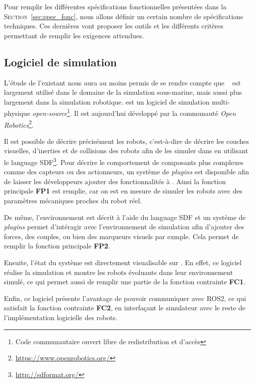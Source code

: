         Pour remplir les différentes spécifications fonctionnelles présentées dans la \textsc{Section}~\ref{sec:spec_fonc}, nous allons définir un certain nombre de spécifications techniques. Ces dernières vont proposer les outils et les différents critères permettant de remplir les exigences attendues.

        \subsection{Logiciel de simulation}

            L'étude de l'existant nous aura au moins permis de se rendre compte que \gazebo{}~\cite{Koenig-gazebo} est largement utilisé dans le domaine de la simulation sous-marine, mais aussi plus largement dans la simulation robotique. \gazebo{} est un logiciel de simulation multi-physique \textit{open-source}\footnote{Code communautaire ouvert libre de redistribution et d'accès}. Il est aujourd'hui développé par la communauté \textit{Open Robotics}\footnote{\url{https://www.openrobotics.org/}}.
            
            Il est possible de décrire précisément les robots, c'est-à-dire de décrire les couches visuelles, d'inerties et de collisions des robots afin de les simuler dans \gazebo{} en utilisant le language \gls{SDF}\footnote{\url{http://sdformat.org/}}. Pour décrire le comportement de composants plus complexes comme des capteurs ou des actionneurs, un système de \textit{plugins} est disponible afin de laisser les développeurs ajouter des fonctionnalités à \gazebo{}. Ainsi la fonction principale \textbf{FP1} est remplie, car on est en mesure de simuler les robots avec des paramètres mécaniques proches du robot réel.

            De même, l'environnement est décrit à l'aide du language \gls{SDF} et un système de \textit{plugins} permet d'intéragir avec l'environnement de simulation afin d'ajouter des forces, des couples, ou bien des marqueurs visuels par exmple. Cela permet de remplir la fonction principale \textbf{FP2}.

            Ensuite, l'état du système est directement visualisable sur \gazebo{}. En effet, ce logiciel réalise la simulation et montre les robots évoluants dans leur environnement simulé, ce qui permet aussi de remplir une partie de la fonction contrainte \textbf{FC1}.

            Enfin, ce logiciel présente l'avantage de pouvoir communiquer avec \gls{ROS2}, ce qui satisfait la fonction contrainte \textbf{FC2}, en interfaçant le simulateur avec le reste de l'implémentation logicielle des robots.

